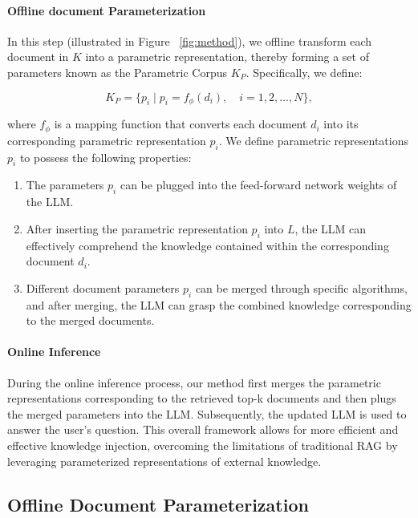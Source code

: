 \documentclass[sigconf,natbib=true,anonymous=false]{acmart}
\begin{document}
\paragraph{Offline document Parameterization} In this step (illustrated in Figure ~\ref{fig:method}), we offline transform each document in \(K\) into a parametric representation, thereby forming a set of parameters known as the Parametric Corpus \(K_P\). Specifically, we define:

\begin{equation}
K_P = \{ p_i \mid p_i = f_{\phi}(d_i), \quad i = 1, 2, \ldots, N \},
\label{eq:parametric_kb}
\end{equation}

\noindent where \(f_{\phi}\) is a mapping function that converts each document \(d_i\) into its corresponding parametric representation \(p_i\). We define parametric representations \(p_i\) to possess the following properties:

\begin{enumerate}[leftmargin=*]
    \item The parameters \(p_i\) can be plugged into the feed-forward network weights of the LLM.
    
    \item After inserting the parametric representation \(p_i\) into \(L\), the LLM can effectively comprehend the knowledge contained within the corresponding document \(d_i\).
    
    \item Different document parameters \(p_i\) can be merged through specific algorithms, and after merging, the LLM can grasp the combined knowledge corresponding to the merged documents.
\end{enumerate}



\paragraph{Online Inference} 
During the online inference process, our method first merges the parametric representations corresponding to the retrieved top-k documents and then plugs the merged parameters into the LLM. 
Subsequently, the updated LLM is used to answer the user’s question.
This overall framework allows for more efficient and effective knowledge injection, overcoming the limitations of traditional RAG by leveraging parameterized representations of external knowledge.


\subsection{Offline Document Parameterization}
\label{sec:knowledge}
\end{document}

